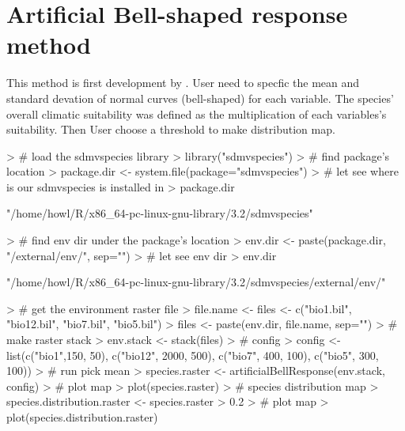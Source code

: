 \documentclass{report}
\begin{document}
\section*{Artificial Bell-shaped response method}
This method is first development by \citet{varela_environmental_2014}.
User need to specfic the mean and standard devation of normal curves (bell-shaped) for each variable. The species' overall climatic suitability was defined as the multiplication of each variables's suitability. Then User choose a threshold to make distribution map.
\begin{Schunk}
\begin{Sinput}
> # load the sdmvspecies library
> library("sdmvspecies")
> # find package's location
> package.dir <- system.file(package="sdmvspecies")
> # let see where is our sdmvspecies is installed in
> package.dir
\end{Sinput}
\begin{Soutput}
[1] "/home/howl/R/x86_64-pc-linux-gnu-library/3.2/sdmvspecies"
\end{Soutput}
\begin{Sinput}
> # find env dir under the package's location
> env.dir <- paste(package.dir, "/external/env/", sep="")
> # let see env dir
> env.dir
\end{Sinput}
\begin{Soutput}
[1] "/home/howl/R/x86_64-pc-linux-gnu-library/3.2/sdmvspecies/external/env/"
\end{Soutput}
\begin{Sinput}
> # get the environment raster file
> file.name <- files <- c("bio1.bil", "bio12.bil", "bio7.bil", "bio5.bil")
> files <- paste(env.dir, file.name, sep="")
> # make raster stack
> env.stack <- stack(files)
> # config
> config <- list(c("bio1",150, 50), c("bio12", 2000, 500), c("bio7", 400, 100), c("bio5", 300, 100))
> # run pick mean
> species.raster <- artificialBellResponse(env.stack, config)
> # plot map
> plot(species.raster)
> # species distribution map
> species.distribution.raster <- species.raster > 0.2
> # plot map
> plot(species.distribution.raster)
\end{Sinput}
\end{Schunk}
\end{document}
